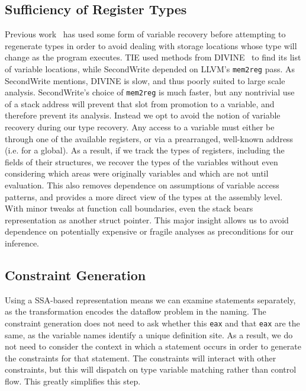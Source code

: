 \subsection{Sufficiency of Register Types}
\label{subsec:regonly}
Previous work~\cite{tie,sw} has used some form of variable recovery before attempting to regenerate types in order to avoid dealing with storage locations whose type will change as the program executes. TIE used methods from DIVINE~\cite{divine} to find its list of variable locations, while SecondWrite depended on LLVM's \texttt{mem2reg} pass. As SecondWrite mentions, DIVINE is slow, and thus poorly suited to large scale analysis. SecondWrite's choice of \texttt{mem2reg} is much faster, but any nontrivial use of a stack address will prevent that slot from promotion to a variable, and therefore prevent its analysis. Instead we opt to avoid the notion of variable recovery during our type recovery. Any access to a variable must either be through one of the available registers, or via a prearranged, well-known address (i.e. for a global). As a result, if we track the types of registers, including the fields of their structures, we recover the types of the variables without even considering which areas were originally variables and which are not until evaluation. This also removes dependence on assumptions of variable access patterns, and provides a more direct view of the types at the assembly level. With  minor tweaks at function call boundaries, even the stack bears representation as another struct pointer. This major insight allows us to avoid dependence on potentially expensive or fragile analyses as preconditions for our inference.

\subsection{Constraint Generation}
Using a SSA-based representation means we can examine statements separately, as the transformation encodes the dataflow problem in the naming. The constraint generation does not need to ask whether this \texttt{eax} and that \texttt{eax} are the same, as the variable names identify a unique definition site. As a result, we do not need to consider the context in which a statement occurs in order to generate the constraints for that statement.
The constraints will interact with other constraints, but this will dispatch on type variable matching rather than control flow.
This greatly simplifies this step.
